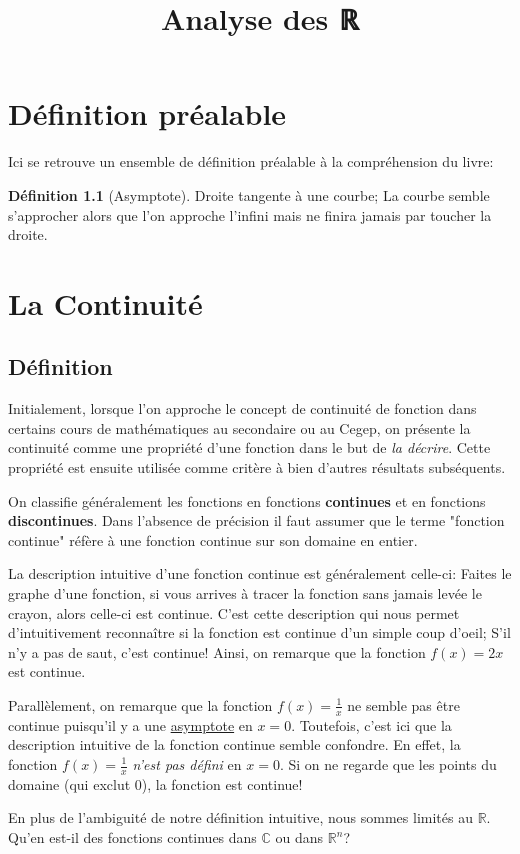 \documentclass[10pt]{book}
\title{Analyse des ℝ}
\let\Bbb\mathbb
\theoremstyle{definition}
\newtheorem{definition}{Définition}[section]
\begin{document}
\chapter{Définition préalable}
Ici se retrouve un ensemble de définition préalable à la compréhension du livre:
\begin{definition}[Asymptote]
    \label{def:asymptote}
    Droite tangente à une courbe; La courbe semble s'approcher alors que l'on approche l'infini mais ne finira
    jamais par toucher la droite.
\end{definition}

\chapter{La Continuité}
\section{Définition}
Initialement, lorsque l'on approche le concept de continuité de fonction dans certains cours de mathématiques au secondaire ou au 
Cegep, on présente la continuité comme une propriété d'une fonction dans le but de \textit{la décrire}. Cette propriété est ensuite
utilisée comme critère à bien d'autres résultats subséquents.

On classifie généralement les fonctions en fonctions \textbf{continues} et en fonctions \textbf{discontinues}. Dans l'absence de précision
il faut assumer que le terme "fonction continue" réfère à une fonction continue sur son domaine en entier.

La description intuitive d'une fonction continue est généralement celle-ci: Faites le graphe d'une fonction, si vous arrives à tracer
la fonction sans jamais levée le crayon, alors celle-ci est continue. C'est cette description qui nous permet d'intuitivement reconnaître si la fonction est continue d'un simple coup d'oeil;
S'il n'y a pas de saut, c'est continue! Ainsi, on remarque que la fonction $f(x) = 2x$ est continue.

Parallèlement, on remarque que la fonction $f(x) = \frac{1}{x}$ ne semble pas être continue puisqu'il y a une \hyperref[def:asymptote]{asymptote} en $x = 0$.
Toutefois, c'est ici que la description intuitive de la fonction continue semble confondre. En effet, la fonction $f(x) = \frac{1}{x}$ \textit{n'est pas défini} en $x = 0$.
Si on ne regarde que les points du domaine (qui exclut 0), la fonction est continue!

En plus de l'ambiguité de notre définition intuitive, nous sommes limités au $\Bbb{R}$. Qu'en est-il des fonctions continues dans $\Bbb{C}$ ou dans $\Bbb{R}^n$?
\end{document}
